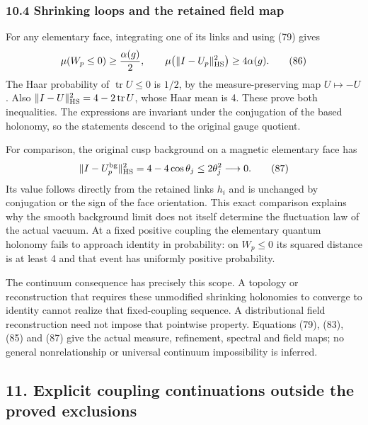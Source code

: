 \documentclass[
  11pt,
]{article}
\begin{document}
\subsubsection{10.4 Shrinking loops and the retained field
map}\label{shrinking-loops-and-the-retained-field-map}

For any elementary face, integrating one of its links and using (79)
gives \[
 \mu(W_p\le0)\ge\frac{\alpha(g)}2,\qquad
 \mu\bigl(\|I-U_p\|_{\rm HS}^2\bigr)\ge4\alpha(g).
 \tag{86}
\] The Haar probability of \(\operatorname{tr}U\le0\) is \(1/2\), by the
measure-preserving map \(U\mapsto-U\). Also
\(\|I-U\|_{\rm HS}^2=4-2\operatorname{tr}U\), whose Haar mean is 4.
These prove both inequalities. The expressions are invariant under the
conjugation of the based holonomy, so the statements descend to the
original gauge quotient.

For comparison, the original cusp background on a magnetic elementary
face has \[
 \|I-U_p^{\rm bg}\|_{\rm HS}^2
       =4-4\cos\theta_j\le2\theta_j^2\longrightarrow0 .
 \tag{87}
\] Its value follows directly from the retained links \(h_i\) and is
unchanged by conjugation or the sign of the face orientation. This exact
comparison explains why the smooth background limit does not itself
determine the fluctuation law of the actual vacuum. At a fixed positive
coupling the elementary quantum holonomy fails to approach identity in
probability: on \(W_p\le0\) its squared distance is at least 4 and that
event has uniformly positive probability.

The continuum consequence has precisely this scope. A topology or
reconstruction that requires these unmodified shrinking holonomies to
converge to identity cannot realize that fixed-coupling sequence. A
distributional field reconstruction need not impose that pointwise
property. Equations (79), (83), (85) and (87) give the actual measure,
refinement, spectral and field maps; no general nonrelationship or
universal continuum impossibility is inferred.

\subsection{11. Explicit coupling continuations outside the proved
exclusions}\label{explicit-coupling-continuations-outside-the-proved-exclusions}
\end{document}
